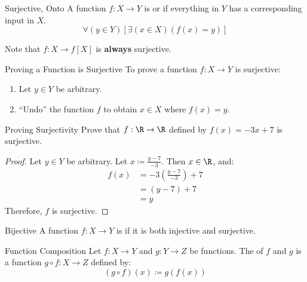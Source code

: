 \begin{dfnbox}{Surjective, Onto}{}
    A function $f : X \to Y$ is  or  if everything in $Y$ has a corresponding input in $X$.
    \tcblower
    \[ \forall (y \in Y) \left[ \exists (x \in X) (f(x) = y) \right] \]
\end{dfnbox}

Note that $f : X \to f[X]$ is \textbf{always} surjective.

\begin{tecbox}{Proving a Function is Surjective}{}
    To prove a function $f : X \to Y$ is surjective:
    \begin{enumerate}
        \item Let $y \in Y$ be arbitrary.
        \item ``Undo'' the function $f$ to obtain $x \in X$ where $f(x)=y$.
    \end{enumerate}
\end{tecbox}

\begin{exbox}{Proving Surjectivity}{}
    Prove that $f : \R \to \R$ defined by $f(x) = -3x+7$ is surjective.
    \tcblower
    \begin{proof}
        Let $y \in Y$ be arbitrary. Let $x \coloneq \frac{y-7}{-3}$. Then $x \in \R$, and:
        \begin{align*}
            f(x)
            &= -3 \left( \frac{y-7}{-3} \right) + 7 \\
            &= (y-7) + 7 \\
            &= y
        \end{align*}
        Therefore, $f$ is surjective.
    \end{proof}
\end{exbox}

\begin{dfnbox}{Bijective}{}
    A function $f : X \to Y$ is  if it is both injective and surjective.
\end{dfnbox}

\begin{dfnbox}{Function Composition}{}
    Let $f : X \to Y$ and $g : Y \to Z$ be functions. The  of $f$ and $g$ is a function $g \circ f : X \to Z$ defined by:
    \[ (g \circ f) (x) \coloneq g(f(x)) \]
\end{dfnbox}

